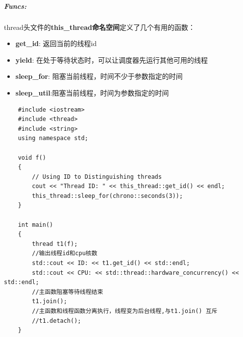 \documentclass[UTF8,a4paper,12pt]{ctexbook}
\begin{document}
		\subparagraph{Funcs:}thread头文件的\textbf{this\_thread命名空间}定义了几个有用的函数：
		\begin{itemize}
			\item \textbf{get\_id}:    返回当前的线程id
			\item \textbf{yield}:  	   在处于等待状态时，可以让调度器先运行其他可用的线程
			\item \textbf{sleep\_for}: 阻塞当前线程，时间不少于参数指定的时间
			\item \textbf{sleep\_util}:阻塞当前线程，时间为参数指定的时间
		\end{itemize}
		\begin{lstlisting}
	#include <iostream>
	#include <thread>
	#include <string>
	using namespace std;
	
	void f()
	{
		// Using ID to Distinguishing threads 
		cout << "Thread ID: " << this_thread::get_id() << endl;
		this_thread::sleep_for(chrono::seconds(3));
	}
	
	int main()
	{
		thread t1(f);
		//输出线程id和cpu核数
		std::cout << ID: << t1.get_id() << std::endl;
		std::cout << CPU: << std::thread::hardware_concurrency() << std::endl;
		//主函数阻塞等待线程结束
		t1.join();
		//主函数和线程函数分离执行，线程变为后台线程,与t1.join() 互斥
		//t1.detach();
	}
		\end{lstlisting}
\end{document}
